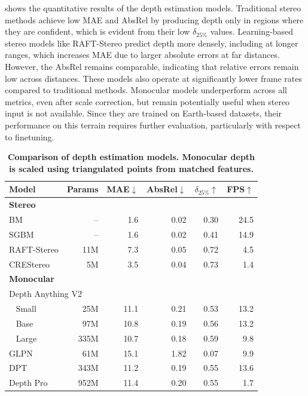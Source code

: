  shows the quantitative results of the depth estimation models.
Traditional stereo methods achieve low MAE and AbsRel by producing depth only in regions where they are confident, which is evident from their low $\delta_{25\%}$ values. Learning-based stereo models like RAFT-Stereo predict depth more densely, including at longer ranges, which increases MAE due to larger absolute errors at far distances. However, the AbsRel remains comparable, indicating that relative errors remain low across distances. These models also operate at significantly lower frame rates compared to traditional methods. Monocular models underperform across all metrics, even after scale correction, but remain potentially useful when stereo input is not available. Since they are trained on Earth-based datasets, their performance on this terrain requires further evaluation, particularly with respect to finetuning.
\begin{table}[t]
	\centering
	\small
	\caption{\bfseries Comparison of depth estimation models. Monocular depth is scaled using triangulated points from matched features.}
	\label{tab:depth_models}
	\begin{tabular}{|lrrrrr|}
		\hline
		\textbf{Model}                          &
		\textbf{Params}                         &
		\textbf{MAE}$\downarrow$                &
		\textbf{AbsRel}$\downarrow$             &
		\textbf{$\delta_{25\%}$}$\uparrow$      &
		\textbf{FPS}$\uparrow$                                                     \\
		\hline\hline
		\textbf{Stereo}                         &      &      &      &      &      \\
		BM                                      & --   & 1.6  & 0.02 & 0.30 & 24.5 \\
		SGBM                                    & --   & 1.6  & 0.02 & 0.41 & 14.9 \\
		RAFT-Stereo                             & 11M  & 7.3  & 0.05 & 0.72 & 4.5  \\
		CREStereo                               & 5M   & 3.5  & 0.04 & 0.73 & 1.4  \\
		\hline\hline
		\multicolumn{2}{|l}{\textbf{Monocular}} &      &      &      &             \\
		\multicolumn{2}{|l}{Depth Anything V2}  &      &      &      &             \\
		~ Small                                 & 25M  & 11.1 & 0.21 & 0.53 & 13.2 \\
		~ Base                                  & 97M  & 10.8 & 0.19 & 0.56 & 13.2 \\
		~ Large                                 & 335M & 10.7 & 0.18 & 0.59 & 9.8  \\
		GLPN                                    & 61M  & 15.1 & 1.82 & 0.07 & 9.9  \\
		DPT                                     & 343M & 11.2 & 0.19 & 0.55 & 13.6 \\
		Depth Pro                               & 952M & 11.4 & 0.20 & 0.55 & 1.7  \\
		\hline
	\end{tabular}
\end{table}

